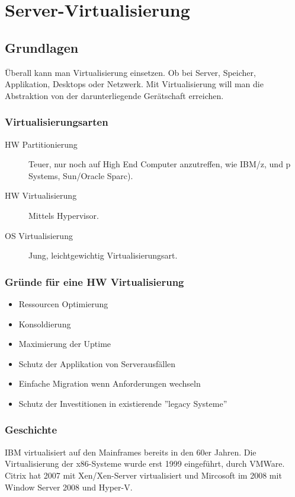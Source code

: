 \chapter{Server-Virtualisierung}

\section{Grundlagen}
Überall kann man Virtualisierung einsetzen. Ob bei Server, Speicher, Applikation, Desktops oder Netzwerk. Mit Virtualisierung will man die Abstraktion von der darunterliegende Gerätschaft erreichen.

\subsection{Virtualisierungsarten}
\begin{description}
	\item[HW Partitionierung] Teuer, nur noch auf High End Computer anzutreffen, wie IBM/z, und p Systems, Sun/Oracle Sparc).
	\item[HW Virtualisierung] Mittels Hypervisor.
	\item[OS Virtualisierung] Jung, leichtgewichtig Virtualisierungsart. 
\end{description}

\subsection{Gründe für eine HW Virtualisierung}
\begin{itemize}
	\item Ressourcen Optimierung
	\item Konsoldierung
	\item Maximierung der Uptime
	\item Schutz der Applikation von Serverausfällen
	\item Einfache Migration wenn Anforderungen wechseln
	\item Schutz der Investitionen in existierende ''legacy Systeme'' 
\end{itemize}

\subsection{Geschichte}
IBM virtualisiert auf den Mainframes bereits in den 60er Jahren. Die Virtualisierung der x86-Systeme wurde erst 1999 eingeführt, durch VMWare. Citrix hat 2007 mit Xen/Xen-Server virtualisiert und Mircosoft im 2008 mit Window Server 2008 und Hyper-V.

